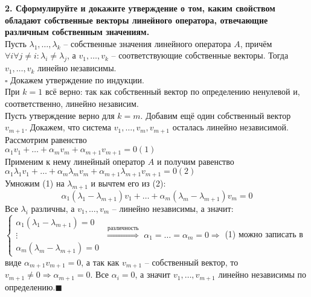 \documentclass[11pt,a4paper]{article}
\newcommand{\proof}{$\square$ }
\newcommand{\qed}{\hfill$\blacksquare$}
\begin{document}
\textbf{2. Сформулируйте и докажите утверждение о том, каким свойством обладают собственные векторы линейного оператора, отвечающие различным собственным значениям.\\}
Пусть $\lambda_1, \hdots, \lambda_k$ -- собственные значения линейного оператора $A$, причём $\forall i \forall j \neq i: \lambda_i \neq \lambda_j$, а $v_1, \hdots, v_k$ -- соответствующие собственные векторы. Тогда $v_1, \hdots, v_k$ линейно независимы.\\
\proof Докажем утверждение по индукции.\\
При $k = 1$ всё верно: так как собственный вектор по определению ненулевой и, соответственно, линейно независим.\\
Пусть утверждение верно для $k = m$. Добавим ещё один собственный вектор $v_{m+1}$. Докажем, что система $v_1, \hdots, v_m, v_{m+1}$ осталась линейно независимой.\\
Рассмотрим равенство\\
$\alpha_1 v_1 + \hdots + \alpha_m v_m + \alpha_{m+1} v_{m+1} = 0$\hfill$(1)$\\
Применим к нему линейный оператор $A$ и получим равенство\\
$\alpha_1 \lambda_1 v_1 + \hdots + \alpha_m \lambda_m v_m + \alpha_{m+1} \lambda_{m+1} v_{m+1} = 0$\hfill$(2)$\\
Умножим (1) на $\lambda_{m+1}$ и вычтем его из (2):
$$\alpha_1 (\lambda_1 - \lambda_{m+1}) v_1 + \hdots + \alpha_m (\lambda_m - \lambda_{m+1}) v_m = 0$$
Все $\lambda_i$ различны, а $v_1, \hdots, v_m$ -- линейно независимы, а значит:
$\begin{cases}\alpha_1 (\lambda_1 - \lambda_{m+1}) = 0 \\
\vdots \\
\alpha_m (\lambda_m - \lambda_{m+1}) = 0\end{cases}$
$\stackrel{\text{различность}}{\Rightarrow}$ $\alpha_1 = \hdots = \alpha_m = 0 \Rightarrow$ (1) можно записать в виде $\alpha_{m+1} v_{m+1} = 0$, а так как $v_{m+1}$ -- собственный вектор, то $v_{m+1} \neq 0 \Rightarrow \alpha_{m+1} = 0$. Все $\alpha_i = 0$, а значит $v_1, \hdots, v_{m+1}$ линейно независимы по определению.\qed
\end{document}
